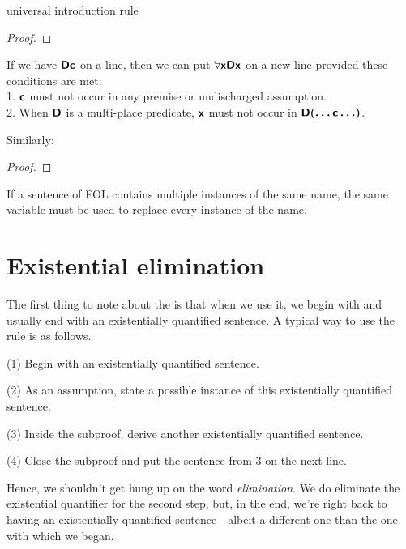 \begin{factboxy}{universal introduction rule}
\begin{proof}
	 
\end{proof}

\small{If we have $\bm{\mathsf{Dc}}$ on a line, then we can put $\forall \bm{\mathsf{xDx}}$ on a new line provided these conditions are met:\\
1. $\bm{\mathsf{c}}$ must not occur in any premise or undischarged assumption.\\
2. When $\bm{\mathsf{D}}$ is a multi-place predicate, $\bm{\mathsf{x}}$ must not occur in $\bm{\mathsf{D(\ldots c\ldots)}}$.
\smallskip

Similarly:}

\begin{proof}
	 
\end{proof}

\small{If a sentence of FOL contains multiple instances of the same name, the same variable must be used to replace every instance of the name.}
\end{factboxy}



\section{Existential elimination}

The first thing to note about the  is that when we use it, we begin with and usually end with an existentially quantified sentence. A typical way to use the rule is as follows. 

\begin{ebullet}
\item[(1)] Begin with an existentially quantified sentence. 
\item[(2)] As an assumption, state a possible instance of this existentially quantified sentence. 
\item[(3)] Inside the subproof, derive another existentially quantified sentence.
\item[(4)] Close the subproof and put the sentence from 3 on the next line. 
\end{ebullet}

\noindent Hence, we shouldn't get hung up on the word \textit{elimination}. We do eliminate the existential quantifier for the second step, but, in the end, we're right back to having an existentially quantified sentence---albeit a different one than the one with which we began.


